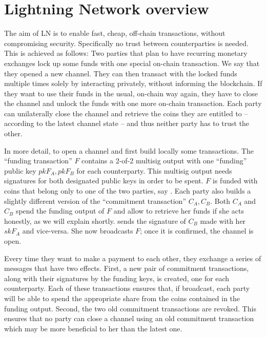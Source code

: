 \section{Lightning Network overview}
\label{sec:ov-ln}

    The aim of LN is to enable fast, cheap, off-chain transactions, without
    compromising security. Specifically no trust between counterparties is
    needed. This is achieved as follows: Two parties that plan to have recurring
    monetary exchanges lock up some funds with one special on-chain transaction.
    We say that they opened a new channel. They can then transact with the
    locked funds multiple times solely by interacting privately, without
    informing the blockchain. If they want to use their funds in the usual,
    on-chain way again, they have to close the channel and unlock the funds with
    one more on-chain transaction. Each party can unilaterally close the channel
    and retrieve the coins they are entitled to -- according to the latest
    channel state -- and thus neither party has to trust the other.

    In more detail, to open a channel \alice{} and \bob{} first build locally
    some transactions. The ``funding transaction'' $F$ contains a 2-of-2
    multisig output with one ``funding'' public key $pkF_A, pkF_B$ for each
    counterparty. This multisig output needs signatures for both designated
    public keys in order to be spent. $F$ is funded with coins that belong only
    to one of the two parties, say \alice. Each party also builds a slightly
    different version of the ``commitment transaction'' $C_A, C_B$. Both $C_A$
    and $C_B$ spend the funding output of $F$ and allow \alice{} to retrieve her
    funds if she acts honestly, as we will explain shortly. \alice{} sends
    \bob{} the signature of $C_B$ made with her $skF_A$ and vice-versa. She now
    broadcasts $F$; once it is confirmed, the channel is open.

    Every time they want to make a payment to each other, they exchange a series
    of messages that have two effects. First, a new pair of commitment
    transactions, along with their signatures by the funding keys, is created,
    one for each counterparty. Each of these transactions ensures that, if
    broadcast, each party will be able to spend the appropriate share from the
    coins contained in the funding output. Second, the two old commitment
    transactions are revoked. This ensures that no party can close a channel
    using an old commitment transaction which may be more beneficial to her than
    the latest one.

